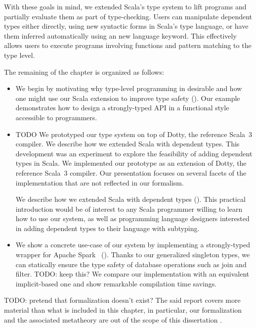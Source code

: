 With these goals in mind, we extended Scala's type system to lift programs and partially evaluate them as part of type-checking.
Users can manipulate dependent types either directly, using new syntactic forms in Scala's type language, or have them inferred automatically using an new language keyword.
This effectively allows users to execute programs involving functions and pattern matching to the type level.

The remaining of the chapter is organized as follows:

\begin{itemize}
\item
  We begin by motivating why type-level programming in desirable and how one might use our Scala extension to improve type safety (). Our example demonstrates how to design a strongly-typed API in a functional style accessible to programmers.
\item
  TODO
  We prototyped our type system on top of Dotty, the reference Scala~3 compiler.
  We describe how we extended Scala with dependent types.
  This development was an experiment to explore the feasibility of adding dependent types in Scala.
  We implemented our prototype as an extension of Dotty, the reference Scala~3 compiler.
  Our presentation focuses on several facets of the implementation that are not reflected in our formalism.

  We describe how we extended Scala with dependent types (). This practical introduction would be of interest to any Scala programmer willing to learn how to use our system, as well as programming language designers interested in adding dependent types to their language with subtyping.
\item
  We show a concrete use-case of our system by implementing a strongly-typed wrapper for Apache Spark~\citep{zaharia2016apache} ().
  Thanks to our generalized singleton types, we can statically ensure the type safety of database operations such as join and filter.
  TODO: keep this?
  We compare our implementation with an equivalent implicit-based one and show remarkable compilation time savings.
\end{itemize}

TODO: pretend that formalization doesn't exist?
The said report covers more material than what is included in this chapter, in particular, our formalization and the associated metatheory are out of the scope of this dissertation \citep[Section 3 and 4]{schmid2020coming}.


